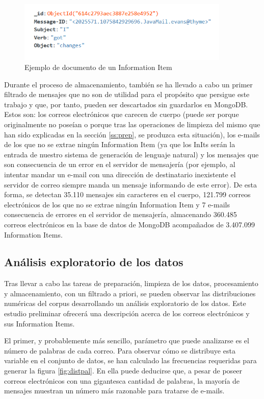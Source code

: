 \begin{figure}[h]
	\centering%
	\centerline{\includegraphics[width = 0.9\textwidth]{Imagenes/Bitmap/initexample.png}}%
	\caption{Ejemplo de documento de un Information Item}%
	\label{fig:initexample}
\end{figure}

Durante el proceso de almacenamiento, también se ha llevado a cabo un primer filtrado de mensajes que no son de utilidad para el propósito que persigue este trabajo y que, por tanto, pueden ser descartados sin guardarlos en MongoDB. Estos son: los correos electrónicos que carecen de cuerpo (puede ser porque originalmente no poseían o porque tras las operaciones de limpieza del mismo que han sido explicadas en la sección \ref{ss:prep}, se produzca esta situación), los e-mails de los que no se extrae ningún Information Item (ya que los InIts serán la entrada de nuestro sistema de generación de lenguaje natural) y los mensajes que son consecuencia de un error en el servidor de mensajería (por ejemplo, al intentar mandar un e-mail con una dirección de destinatario inexistente el servidor de correo siempre manda un mensaje informando de este error). De esta forma, se detectan 35.110 mensajes sin caracteres en el cuerpo, 121.799 correos electrónicos de los que no se extrae ningún Information Item y 7 e-mails consecuencia de errores en el servidor de mensajería, almacenando 360.485 correos electrónicos en la base de datos de MongoDB acompañados de 3.407.099 Information Items.

\subsection{Análisis exploratorio de los datos}\label{ss:eda}
Tras llevar a cabo las tareas de preparación, limpieza de los datos, procesamiento y almacenamiento, con un filtrado a priori, se pueden observar las distribuciones numéricas del corpus desarrollando un análisis exploratorio de los datos. Este estudio preliminar ofrecerá una descripción acerca de los correos electrónicos y sus Information Items.

El primer, y probablemente más sencillo, parámetro que puede analizarse es el número de palabras de cada correo. Para observar cómo se distribuye esta variable en el conjunto de datos, se han calculado las frecuencias requeridas para generar la figura \ref{fig:distpal}. En ella puede deducirse que, a pesar de poseer correos electrónicos con una gigantesca cantidad de palabras, la mayoría de mensajes muestran un número más razonable para tratarse de e-mails.

